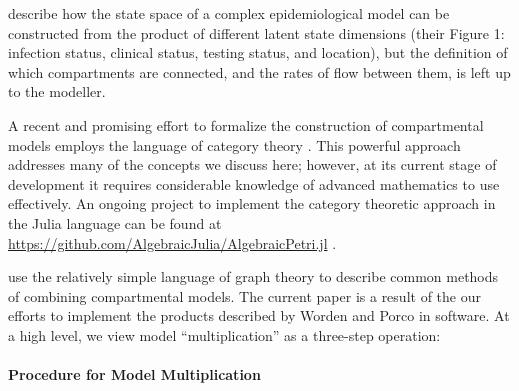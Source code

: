 \cite{friston2020dynamic} describe how the state space of a complex epidemiological model can be constructed from the product of different latent state dimensions (their Figure 1: infection status, clinical status, testing status, and location), but the definition of which compartments are connected, and the rates of flow between them, is left up to the modeller.

A recent and promising effort to formalize the construction of compartmental models employs the language of category theory \citep{fong2018seven, Libkind2022an, libkind2021operadic, baez2022compositional, baez2017compositional}. This powerful approach addresses many of the concepts we discuss here; however, at its current stage of development it requires considerable knowledge of advanced mathematics to use effectively.  An ongoing project to implement the category theoretic approach in the Julia language can be found at \url{https://github.com/AlgebraicJulia/AlgebraicPetri.jl} \citep{algebraicjulia}. 

\cite{worden2017products} use the relatively simple language of graph theory to describe common methods of combining compartmental models. The current paper is a result of the our efforts to implement the products described by Worden and Porco in software.  At a high level, we view model ``multiplication'' as a three-step operation:



\paragraph{Procedure for Model Multiplication}\label{genproc}

